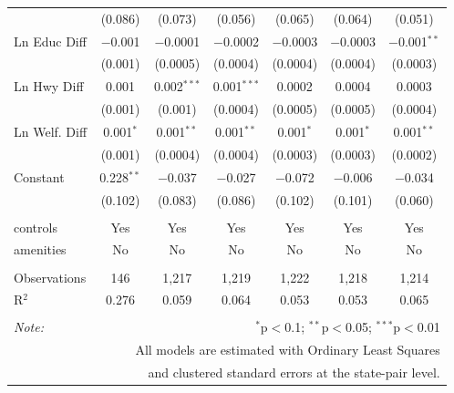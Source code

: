 \begin{table}[!htbp]
\begin{tabular}{@{\extracolsep{5pt}}lcccccc}
  & (0.086) & (0.073) & (0.056) & (0.065) & (0.064) & (0.051) \\ 
  Ln Educ Diff & $-$0.001 & $-$0.0001 & $-$0.0002 & $-$0.0003 & $-$0.0003 & $-$0.001$^{**}$ \\ 
  & (0.001) & (0.0005) & (0.0004) & (0.0004) & (0.0004) & (0.0003) \\ 
  Ln Hwy Diff & 0.001 & 0.002$^{***}$ & 0.001$^{***}$ & 0.0002 & 0.0004 & 0.0003 \\ 
  & (0.001) & (0.001) & (0.0004) & (0.0005) & (0.0005) & (0.0004) \\ 
  Ln Welf. Diff & 0.001$^{*}$ & 0.001$^{**}$ & 0.001$^{**}$ & 0.001$^{*}$ & 0.001$^{*}$ & 0.001$^{**}$ \\ 
  & (0.001) & (0.0004) & (0.0004) & (0.0003) & (0.0003) & (0.0002) \\ 
  Constant & 0.228$^{**}$ & $-$0.037 & $-$0.027 & $-$0.072 & $-$0.006 & $-$0.034 \\ 
  & (0.102) & (0.083) & (0.086) & (0.102) & (0.101) & (0.060) \\ 
 \hline \\[-1.8ex] 
controls & Yes & Yes & Yes & Yes & Yes & Yes \\ 
amenities & No & No & No & No & No & No \\ 
\hline \\[-1.8ex] 
Observations & 146 & 1,217 & 1,219 & 1,222 & 1,218 & 1,214 \\ 
R$^{2}$ & 0.276 & 0.059 & 0.064 & 0.053 & 0.053 & 0.065 \\ 
\hline 
\hline \\[-1.8ex] 
\textit{Note:}  & \multicolumn{6}{r}{$^{*}$p$<$0.1; $^{**}$p$<$0.05; $^{***}$p$<$0.01} \\ 
 & \multicolumn{6}{r}{All models are estimated with Ordinary Least Squares} \\ 
 & \multicolumn{6}{r}{and clustered standard errors at the state-pair level.} \\ 
\end{tabular} 
\end{table} 
